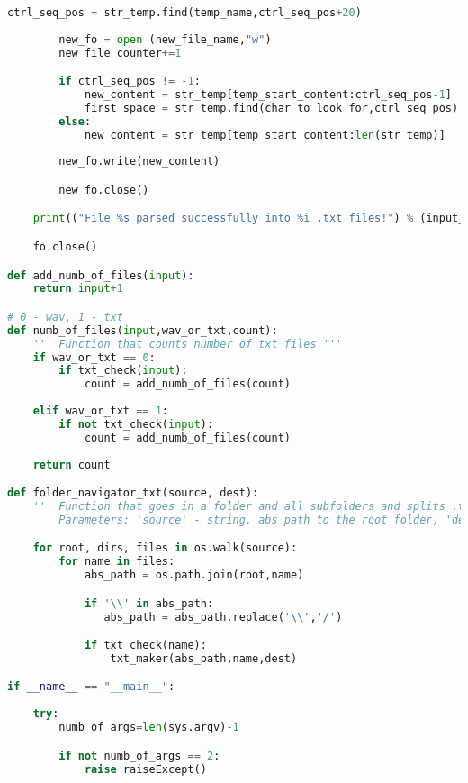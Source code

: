 \begin{lstlisting}[language=Python, caption=txtFileMaker code.]
        ctrl_seq_pos = str_temp.find(temp_name,ctrl_seq_pos+20)
                      
        new_fo = open (new_file_name,"w")
        new_file_counter+=1

        if ctrl_seq_pos != -1:        
            new_content = str_temp[temp_start_content:ctrl_seq_pos-1]
            first_space = str_temp.find(char_to_look_for,ctrl_seq_pos)
        else:
            new_content = str_temp[temp_start_content:len(str_temp)]            # could be problematic, maybe
        
        new_fo.write(new_content)

        new_fo.close()

    print(("File %s parsed successfully into %i .txt files!") % (input_name, new_file_counter))

    fo.close()

def add_numb_of_files(input):
    return input+1

# 0 - wav, 1 - txt
def numb_of_files(input,wav_or_txt,count):
    ''' Function that counts number of txt files '''
    if wav_or_txt == 0:
        if txt_check(input):
            count = add_numb_of_files(count)
        
    elif wav_or_txt == 1:
        if not txt_check(input):
            count = add_numb_of_files(count)
    
    return count 

def folder_navigator_txt(source, dest):
    ''' Function that goes in a folder and all subfolders and splits .txt files into multiple .txt files so that the .wav files and .txt files are 1 to 1 pairs.
        Parameters: 'source' - string, abs path to the root folder, 'dest' - string, abs path to dest folder (both must be with a '/' at the end!) '''

    for root, dirs, files in os.walk(source):
        for name in files:
            abs_path = os.path.join(root,name)

            if '\\' in abs_path:
               abs_path = abs_path.replace('\\','/')

            if txt_check(name):
                txt_maker(abs_path,name,dest)

if __name__ == "__main__":
    
    try: 
        numb_of_args=len(sys.argv)-1

        if not numb_of_args == 2: 
            raise raiseExcept()
            

\end{lstlisting}
